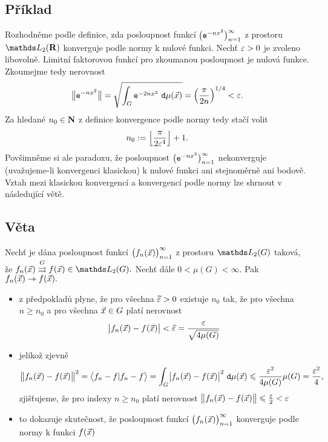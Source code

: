 \subsection{P\v r\'iklad}

Rozhodn\v eme podle definice, zda posloupnost funkc\'i $\bigl(\mathtt{e}^{-nx^2}\bigr)_{n=1}^\infty$ z prostoru $\LL_2(\R)$ konverguje podle normy k nulov\'e funkci. Nech\v t $\varepsilon>0$ je zvoleno libovoln\v e. Limitn\'i faktorovou funkc\'i pro zkoumanou posloupnost je nulov\'a funkce. Zkoumejme tedy nerovnost $$\bigl\|\mathtt{e}^{-nx^2}\bigr\|=\sqrt{\int_G \mathtt{e}^{-2nx^2} ~\mathtt{d}\mu({\vec{x}})}=\left(\frac{\pi}{2n}\right)^{1/4}<\varepsilon.$$ Za hledan\'e $n_0\in{\mathbf N}$ z definice konvergence podle normy tedy sta\v c\'i volit $$n_0:=\left\lfloor\frac{\pi}{2\varepsilon^4}\right\rfloor+1.$$ Pov\v simn\v eme si ale paradoxu, \v ze posloupnost $\bigl(\mathtt{e}^{-nx^2}\bigr)_{n=1}^\infty$ nekonverguje (uva\v zujeme-li konvergenci klasickou) k nulov\'e funkci ani stejnom\v ern\v e ani bodov\v e. Vztah mezi klasickou konvergenc\'i a konvergenc\'i podle normy lze shrnout v n\'asleduj\'ic\'i v\v et\v e.

\subsection{V\v eta}

Nech\v t je d\'ana posloupnost funkc\'i $\bigl(f_n({\vec{x}})\bigr)_{n=1}^\infty$ z prostoru $\LL_2(G)$ takov\'a, \v ze $f_n(\x) \stackrel{G}{\rightrightarrows} f(\x) \in \LL_2(G).$ Nech\v t d\'ale $0<\mu(G)<\infty.$ Pak $f_n({\vec{x}}) \rightarrowtriangle f({\vec{x}}).$\\

\Proof

\begin{itemize}
\item z p\v redpoklad\r u plyne, \v ze  pro v\v sechna $\widetilde{\varepsilon} >0$ existuje $n_0$ tak, \v ze pro
v\v sechna $n \geq n_0$ a pro v\v sechna ${\vec{x}}\in G$ plat\'i nerovnost $$\bigl| f_n({\vec{x}})-f({\vec{x}}) \bigr| < \widetilde{\varepsilon} = \frac{\varepsilon}{\sqrt{4\mu(G)}}$$
\item jeliko\v z zjevn\v e $$\bigl\|f_n({\vec{x}})-f({\vec{x}})\bigr\|^2 = \bigl\langle f_n-f|f_n-f \bigr\rangle = \int_G \bigl| f_n({\vec{x}})-f({\vec{x}}) \bigr|^2~\mathtt{d}\mu({\vec{x}}) \leqslant \frac{\varepsilon^2}{4\mu(G)} \mu(G) = \frac{\varepsilon^2}{4},$$ zji\v s\v tujeme, \v ze pro indexy $n\geq n_0$ plat\'i nerovnost $\bigl\|f_n({\vec{x}})-f({\vec{x}})\bigr\| \leqslant \frac{\varepsilon}{2} < \varepsilon$
\item to dokazuje skute\v cnost, \v ze posloupnost funkc\'i $\bigl(f_n({\vec{x}})\bigr)_{n=1}^\infty$  konverguje podle normy k funkci $f({\vec{x}})$
\end{itemize}

